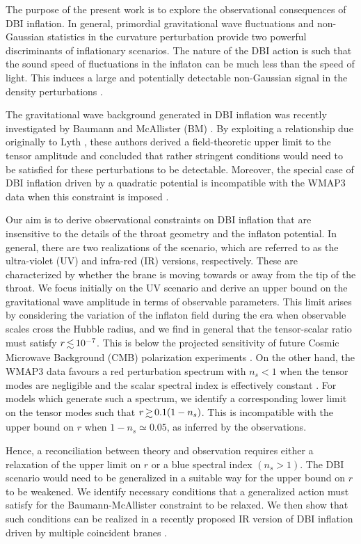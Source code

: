 The purpose of the present work is to 
explore the observational consequences of DBI inflation. 
In general, primordial gravitational wave fluctuations
and non-Gaussian statistics in the curvature perturbation provide 
two powerful discriminants of inflationary scenarios. 
The nature of the DBI action is such that the sound 
speed of fluctuations in the inflaton can be much less than the speed of 
light. This induces a large and potentially detectable non-Gaussian 
signal in the density perturbations \cite{brane6,brane11,lidser3,chenetal}. 

The gravitational wave background generated in DBI 
inflation was recently investigated by Baumann and McAllister (BM) 
\cite{bmpaper}. By exploiting a relationship due originally 
to Lyth \cite{lyth}, these authors derived a field-theoretic upper limit 
to the tensor amplitude and concluded that 
rather stringent conditions would need to be satisfied for these 
perturbations to be detectable.      
Moreover, the special case of 
DBI inflation driven by a quadratic potential is incompatible with the WMAP3 
data when this constraint is imposed \cite{bean}.  

Our aim is to derive observational constraints on DBI inflation that are 
insensitive to the details of the throat geometry and the inflaton potential. 
In general, there are two realizations of the scenario, 
which are referred to as the ultra-violet (UV) and infra-red (IR) 
versions, respectively. These are characterized by whether the brane is 
moving towards or away from the tip of the throat. 
We focus initially on the UV scenario 
and derive an upper bound on 
the gravitational wave amplitude in terms of observable 
parameters. This limit arises by considering 
the variation of the inflaton field during the era when 
observable scales cross the Hubble radius, and 
we find in general that the tensor-scalar ratio must satisfy 
$r \, \lsim \, 10^{-7}$. This 
is below the projected sensitivity of future Cosmic Microwave Background (CMB) polarization 
experiments \cite{clover,vpj}. On the other hand, the WMAP3 data 
favours a red perturbation spectrum with 
$n_s<1$ when the tensor modes are negligible and 
the scalar spectral index is effectively constant \cite{spergel}. 
For models which generate such a spectrum, 
we identify a corresponding lower limit on the 
tensor modes such that $r \, \gsim \, 0.1 (1-n_s)$. 
This is incompatible with the upper bound 
on $r$ when $1-n_s \simeq 0.05$, as inferred
by the observations. 

Hence, a reconciliation between theory and observation 
requires either a relaxation of the upper limit on $r$ or a blue 
spectral index $(n_s >1)$. The DBI scenario would need 
to be generalized in a suitable way for the upper bound on $r$
to be weakened. We identify necessary conditions that a 
generalized action must satisfy for the Baumann-McAllister
 constraint to be relaxed. 
We then show that such conditions can be realized in a recently 
proposed IR version of DBI inflation driven
by multiple coincident branes \cite{thomasward}. 

